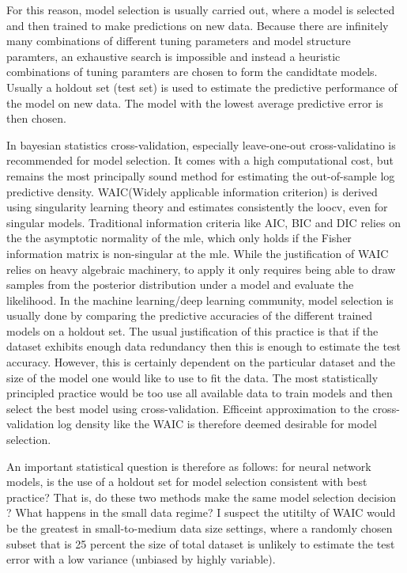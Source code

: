 \documentclass{book}
\begin{document}
\begin{enumerate}
For this reason, model selection is usually carried out, where a model is selected and then trained to make predictions on new data. Because there are infinitely many combinations of different tuning parameters and model structure paramters, an exhaustive search is impossible and instead a heuristic combinations of tuning paramters are chosen to form the candidtate models. Usually a holdout set (test set) is used to estimate the predictive performance of the model on new data. The model with the lowest average predictive error is then chosen. 

In bayesian statistics \cite{gelman2014bayesian} cross-validation, especially leave-one-out cross-validatino is recommended for model selection. It comes with a high computational cost, but remains the most principally sound method for estimating the out-of-sample log predictive density. WAIC(Widely applicable information criterion) is derived using singularity learning theory and estimates consistently the loocv, even for singular models. Traditional information criteria like AIC, BIC and DIC relies on the the asymptotic normality of the mle, which only holds if the Fisher information matrix is non-singular at the mle. While the justification of WAIC relies on heavy algebraic machinery, to apply it only requires being able to draw samples from the posterior distribution under a model and evaluate the likelihood.  
In the machine learning/deep learning community, model selection is usually done
by comparing the predictive accuracies of the different trained models on a
holdout set. The usual justification of this practice is that if the dataset
exhibits enough data redundancy then  this is enough to estimate the test
accuracy. However, this is certainly dependent on the particular dataset and the
size of the model one would like to use to fit the data. The most statistically
principled practice would be too use all available data to train models and then
select the best model using cross-validation. Efficeint approximation to the
cross-validation log density like the WAIC is therefore deemed desirable for
model selection. 

An important statistical question is therefore as follows: for neural network models, is
the use of a holdout set for model selection consistent with best practice?
That is, do these two methods make the same model selection decision ? What happens
in the small data regime? I suspect the utitilty of WAIC would be the greatest
in small-to-medium data size settings, where a randomly chosen subset that is 25
percent the size of total dataset is unlikely to estimate the test error with a
low variance (unbiased by highly variable).


\end{enumerate}
\end{document}
